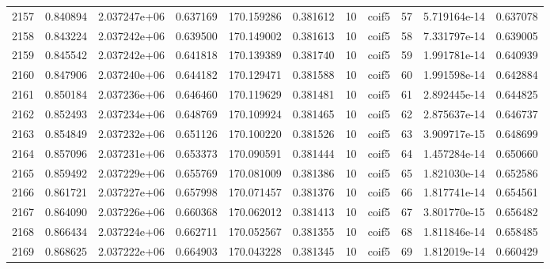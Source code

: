 \begin{tabular}{lrrrrrrlrrr}
2157 &    0.840894 &        2.037247e+06 &  0.637169 &              170.159286 &    0.381612 &      10 &        coif5 &     57 &   5.719164e-14 &      0.637078 \\
2158 &    0.843224 &        2.037242e+06 &  0.639500 &              170.149002 &    0.381613 &      10 &        coif5 &     58 &   7.331797e-14 &      0.639005 \\
2159 &    0.845542 &        2.037242e+06 &  0.641818 &              170.139389 &    0.381740 &      10 &        coif5 &     59 &   1.991781e-14 &      0.640939 \\
2160 &    0.847906 &        2.037240e+06 &  0.644182 &              170.129471 &    0.381588 &      10 &        coif5 &     60 &   1.991598e-14 &      0.642884 \\
2161 &    0.850184 &        2.037236e+06 &  0.646460 &              170.119629 &    0.381481 &      10 &        coif5 &     61 &   2.892445e-14 &      0.644825 \\
2162 &    0.852493 &        2.037234e+06 &  0.648769 &              170.109924 &    0.381465 &      10 &        coif5 &     62 &   2.875637e-14 &      0.646737 \\
2163 &    0.854849 &        2.037232e+06 &  0.651126 &              170.100220 &    0.381526 &      10 &        coif5 &     63 &   3.909717e-15 &      0.648699 \\
2164 &    0.857096 &        2.037231e+06 &  0.653373 &              170.090591 &    0.381444 &      10 &        coif5 &     64 &   1.457284e-14 &      0.650660 \\
2165 &    0.859492 &        2.037229e+06 &  0.655769 &              170.081009 &    0.381386 &      10 &        coif5 &     65 &   1.821030e-14 &      0.652586 \\
2166 &    0.861721 &        2.037227e+06 &  0.657998 &              170.071457 &    0.381376 &      10 &        coif5 &     66 &   1.817741e-14 &      0.654561 \\
2167 &    0.864090 &        2.037226e+06 &  0.660368 &              170.062012 &    0.381413 &      10 &        coif5 &     67 &   3.801770e-15 &      0.656482 \\
2168 &    0.866434 &        2.037224e+06 &  0.662711 &              170.052567 &    0.381355 &      10 &        coif5 &     68 &   1.811846e-14 &      0.658485 \\
2169 &    0.868625 &        2.037222e+06 &  0.664903 &              170.043228 &    0.381345 &      10 &        coif5 &     69 &   1.812019e-14 &      0.660429 \\

\end{tabular}
